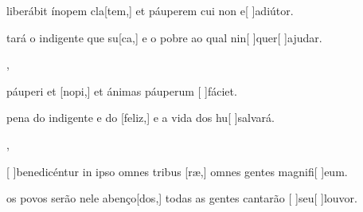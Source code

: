 {    {\item {} liberábit ínopem cla[tem,] et páuperem cui non e[ ]{ad}{iú}tor.}%
        {\item {}tará o indigente que su[ca,] e o pobre ao qual nin[ ]{quer}[ ]{a}judar.},
    {\item {} páuperi et [nopi,] et ánimas páuperum [ ]{fá}ciet.}%
        {\item {} pena do indigente e do [feliz,] e a vida dos hu[ ]{sal}vará.},
    {\item {}[ ]{be}nedicéntur in ipso omnes tribus [ræ,] omnes gentes magnifi[ ]{e}um.}%
        {\item {} os povos serão nele abenço[dos,] todas as gentes cantarão [ ]{seu}[ ]{lou}vor.}
}
